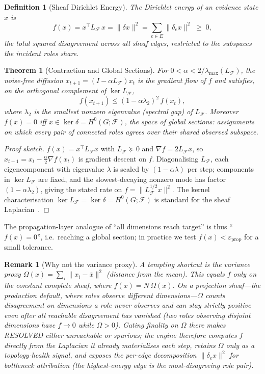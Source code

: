 \documentclass[11pt]{article}
\newtheorem{definition}{Definition}
\newtheorem{theorem}{Theorem}
\newtheorem{remark}{Remark}
\begin{document}
\begin{definition}[Sheaf Dirichlet Energy]
\label{def:dirichlet}
The Dirichlet energy of an evidence state $x$ is
\[
f(x) = x^\top L_{\mathcal{F}}\, x = \|\delta x\|^2 = \sum_{e \in E} \|\delta_e x\|^2 \; \geq \; 0,
\]
the total squared disagreement across all sheaf edges, restricted to the subspaces the incident roles share.
\end{definition}

\begin{theorem}[Contraction and Global Sections]
\label{thm:dirichlet-contraction}
For $0 < \alpha < 2/\lambda_{\max}(L_{\mathcal{F}})$, the noise-free diffusion $x_{t+1} = (I - \alpha L_{\mathcal{F}}) x_t$ is the gradient flow of $f$ and satisfies, on the orthogonal complement of $\ker L_{\mathcal{F}}$,
\[
f(x_{t+1}) \leq (1 - \alpha \lambda_2)^2\, f(x_t),
\]
where $\lambda_2$ is the smallest nonzero eigenvalue (spectral gap) of $L_{\mathcal{F}}$. Moreover $f(x) = 0$ iff $x \in \ker \delta = H^0(G;\mathcal{F})$, the space of \emph{global sections}: assignments on which every pair of connected roles agrees over their shared observed subspace.
\end{theorem}

\begin{proof}[Proof sketch]
$f(x) = x^\top L_{\mathcal{F}} x$ with $L_{\mathcal{F}} \succeq 0$ and $\nabla f = 2 L_{\mathcal{F}} x$, so $x_{t+1} = x_t - \tfrac{\alpha}{2}\nabla f(x_t)$ is gradient descent on $f$. Diagonalising $L_{\mathcal{F}}$, each eigencomponent with eigenvalue $\lambda$ is scaled by $(1-\alpha\lambda)$ per step; components in $\ker L_{\mathcal{F}}$ are fixed, and the slowest-decaying nonzero mode has factor $(1-\alpha\lambda_2)$, giving the stated rate on $f = \|L_{\mathcal{F}}^{1/2} x\|^2$. The kernel characterisation $\ker L_{\mathcal{F}} = \ker \delta = H^0(G;\mathcal{F})$ is standard for the sheaf Laplacian~\cite{ghrist2022}.
\end{proof}

The propagation-layer analogue of ``all dimensions reach target'' is thus ``$f(x) = 0$'', i.e.\ reaching a global section; in practice we test $f(x) < \varepsilon_{\mathrm{prop}}$ for a small tolerance.

\begin{remark}[Why not the variance proxy]
\label{rem:omega-proxy}
A tempting shortcut is the variance proxy $\Omega(x) = \sum_i \|x_i - \bar{x}\|^2$ (distance from the mean). This equals $f$ only on the constant complete sheaf, where $f(x) = N\,\Omega(x)$. On a \emph{projection} sheaf---the production default, where roles observe different dimensions---$\Omega$ counts disagreement on dimensions a role never observes and can stay strictly positive even after all \emph{reachable} disagreement has vanished (two roles observing disjoint dimensions have $f \to 0$ while $\Omega > 0$). Gating finality on $\Omega$ there makes RESOLVED either unreachable or spurious; the engine therefore computes $f$ directly from the Laplacian it already materialises each step, retains $\Omega$ only as a topology-health signal, and exposes the per-edge decomposition $\|\delta_e x\|^2$ for bottleneck attribution (the highest-energy edge is the most-disagreeing role pair).
\end{remark}
\end{document}
